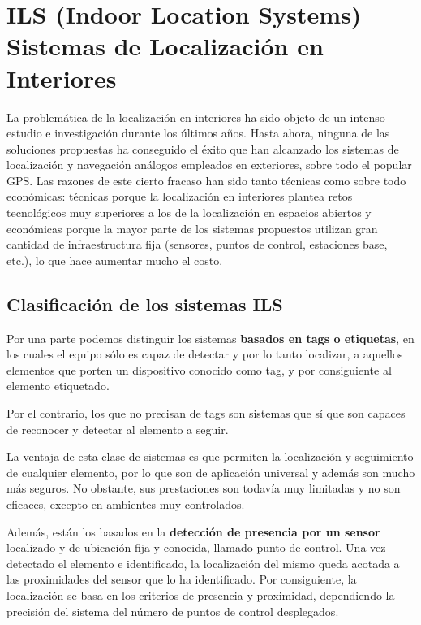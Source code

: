 \section{ILS (Indoor Location Systems) Sistemas de Localización en Interiores}

La problemática de la localización en interiores ha sido objeto de un intenso estudio e investigación durante los últimos años. Hasta ahora, ninguna de las soluciones propuestas ha conseguido el éxito que han alcanzado los sistemas de localización y navegación análogos empleados en exteriores, sobre todo el popular GPS. Las razones de este cierto fracaso han sido tanto técnicas como sobre todo económicas: técnicas porque la localización en interiores plantea retos tecnológicos muy superiores a los de la localización en espacios abiertos y económicas porque la mayor parte de los sistemas propuestos utilizan gran cantidad de infraestructura fija (sensores, puntos de control, estaciones base, etc.), lo que hace aumentar mucho el costo.

\subsection{Clasificación de los sistemas ILS}

Por una parte podemos distinguir los sistemas \textbf{basados en tags o etiquetas}, en los cuales el equipo sólo es capaz de detectar y por lo tanto localizar, a aquellos elementos que porten un dispositivo conocido como tag, y por consiguiente al elemento etiquetado.

Por el contrario, los que no precisan de tags son sistemas que sí que son capaces de reconocer y detectar al elemento a seguir.

La ventaja de esta clase de sistemas es que permiten la localización y seguimiento de cualquier elemento, por lo que son de aplicación universal y además son mucho más seguros. No obstante, sus prestaciones son todavía muy limitadas y no son eficaces, excepto en ambientes muy controlados.

Además, están los basados en la \textbf{detección de presencia por un sensor} localizado y de ubicación fija y conocida, llamado punto de control. Una vez detectado el elemento e identificado, la localización del mismo queda acotada a las proximidades del sensor que lo ha identificado. Por consiguiente, la localización se basa en los criterios de presencia y proximidad, dependiendo la precisión del sistema del número de puntos de control desplegados.

